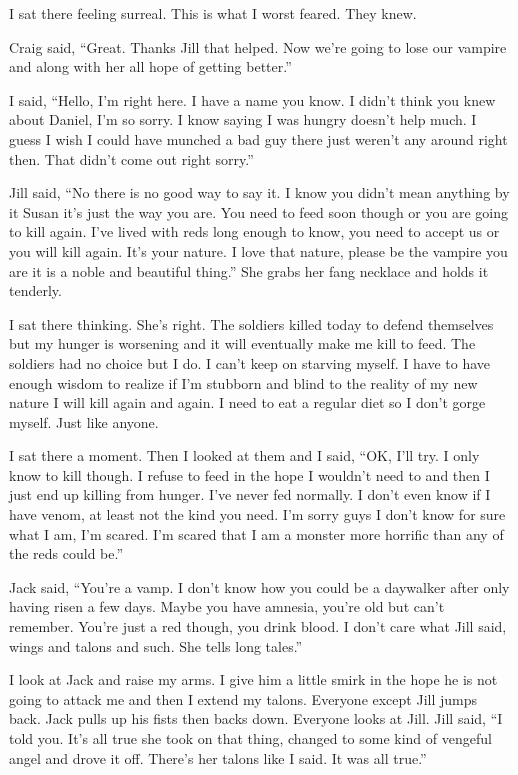 I sat there feeling surreal. This is what I worst feared. They knew.

Craig said, ``Great. Thanks Jill that helped. Now we're going to lose our vampire and along with her all hope of getting better.''

I said, ``Hello, I'm right here. I have a name you know. I didn't think you knew about Daniel, I'm so sorry. I know saying I was hungry doesn't help much. I guess I wish I could have munched a bad guy there just weren't any around right then. That didn't come out right sorry.''

Jill said, ``No there is no good way to say it. I know you didn't mean anything by it Susan it's just the way you are. You need to feed soon though or you are going to kill again. I've lived with reds long enough to know, you need to accept us or you will kill again. It's your nature. I love that nature, please be the vampire you are it is a noble and beautiful thing.'' She grabs her fang necklace and holds it tenderly.

I sat there thinking. She's right. The soldiers killed today to defend themselves but my hunger is worsening and it will eventually make me kill to feed. The soldiers had no choice but I do. I can't keep on starving myself. I have to have enough wisdom to realize if I'm stubborn and blind to the reality of my new nature I will kill again and again. I need to eat a regular diet so I don't gorge myself. Just like anyone.

I sat there a moment. Then I looked at them and I said, ``OK, I'll try. I only know to kill though. I refuse to feed in the hope I wouldn't need to and then I just end up killing from hunger. I've never fed normally. I don't even know if I have venom, at least not the kind you need. I'm sorry guys I don't know for sure what I am, I'm scared. I'm scared that I am a monster more horrific than any of the reds could be.''

Jack said, ``You're a vamp. I don't know how you could be a daywalker after only having risen a few days. Maybe you have amnesia, you're old but can't remember. You're just a red though, you drink blood. I don't care what Jill said, wings and talons and such. She tells long tales.''

I look at Jack and raise my arms. I give him a little smirk in the hope he is not going to attack me and then I extend my talons. Everyone except Jill jumps back. Jack pulls up his fists then backs down. Everyone looks at Jill. Jill said, ``I told you. It's all true she took on that thing, changed to some kind of vengeful angel and drove it off. There's her talons like I said. It was all true.''

